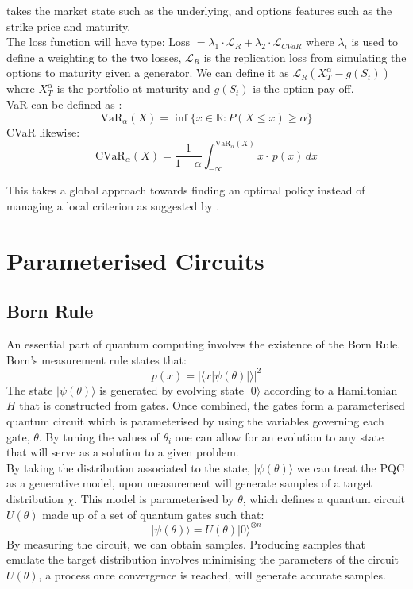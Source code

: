 \documentclass[12pt]{article}
\numberwithin{equation}{section}
\begin{document}
takes the market state such as the underlying, and options features such as the 
strike price and maturity.\\
The loss function will have
type: $\text{Loss }=\lambda_1\cdot\mathcal{L}_R + \lambda_2 \cdot \mathcal{L}_{CVaR}$
where $\lambda_i$ is used to define a weighting to the two losses, $\mathcal{L}_R$ 
is the replication loss from simulating the options to maturity given a generator. 
We can define it as $\mathcal{L}_R(X^\alpha_T-g(S_t))$ where $X^\alpha_T$ is the 
portfolio at maturity and $g(S_t)$ is the option pay-off.\\
VaR can be defined as :
\begin{equation}
\text{VaR}_{\alpha}(X) = \inf \{x \in \mathbb{R} : P(X \leq x) \geq \alpha \}
\end{equation}
CVaR likewise: 
\begin{equation}
\text{CVaR}_{\alpha}(X) = \frac{1}{1 - \alpha} \int_{-\infty}^{\text{VaR}_{\alpha}(X)} x \cdot\, p(x) \, dx
\end{equation}

This takes a global approach towards finding an optimal policy instead of 
managing a local criterion as suggested by \cite{fecamp_deep_2021}.


\clearpage 
\section{Parameterised Circuits} 
\subsection{Born Rule}
An essential part of quantum computing involves the existence of the Born
Rule. Born's measurement rule states that:
\begin{equation}
p(x) = |\langle x|\psi(\theta)|\rangle|^2
\end{equation}
The state $|\psi(\theta)\rangle$ is generated by evolving state $|0\rangle$
according to a Hamiltonian $H$ that is constructed from gates. Once combined, the 
gates form a parameterised quantum circuit which is parameterised by using the 
variables governing each gate, $\theta$. By tuning the values of $\theta_i$ one 
can allow for an evolution to any state that will serve as a solution to a given 
problem. \\ 
By taking the distribution associated to the state, $|\psi(\theta)\rangle$ we can 
treat the PQC as a generative model, upon measurement will 
generate samples of a target distribution $\chi$. This model is parameterised 
by $\theta$, which defines a quantum circuit $U(\theta)$ made up of a set of quantum 
gates such that:
\begin{equation}
|\psi(\theta)\rangle = U(\theta)|0\rangle^{\otimes n}
\end{equation}
By measuring the circuit, we can obtain samples. Producing samples that emulate 
the target distribution involves minimising the parameters of the circuit $U(\theta)$, 
a process once convergence is reached, will generate accurate samples. 
\cite{liu_differentiable_2018}
\end{document}
